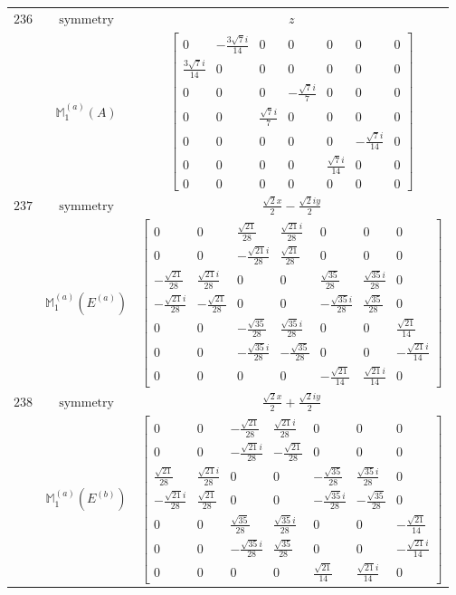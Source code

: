\documentclass[fleqn,8pt,landscape]{jsarticle}
\begin{document}
\begin{longtable}{ccc}
$ 236 $ & $ \text{symmetry} $ & $ z $ \\
$  $ & $ \mathbb{M}_{1}^{(a)}(A) $ & $ \begin{bmatrix} 0 & - \frac{3 \sqrt{7} i}{14} & 0 & 0 & 0 & 0 & 0 \\ \frac{3 \sqrt{7} i}{14} & 0 & 0 & 0 & 0 & 0 & 0 \\ 0 & 0 & 0 & - \frac{\sqrt{7} i}{7} & 0 & 0 & 0 \\ 0 & 0 & \frac{\sqrt{7} i}{7} & 0 & 0 & 0 & 0 \\ 0 & 0 & 0 & 0 & 0 & - \frac{\sqrt{7} i}{14} & 0 \\ 0 & 0 & 0 & 0 & \frac{\sqrt{7} i}{14} & 0 & 0 \\ 0 & 0 & 0 & 0 & 0 & 0 & 0 \end{bmatrix} $ \\ \hline
$ 237 $ & $ \text{symmetry} $ & $ \frac{\sqrt{2} x}{2} - \frac{\sqrt{2} i y}{2} $ \\
$  $ & $ \mathbb{M}_{1}^{(a)}(E^{(a)}) $ & $ \begin{bmatrix} 0 & 0 & \frac{\sqrt{21}}{28} & \frac{\sqrt{21} i}{28} & 0 & 0 & 0 \\ 0 & 0 & - \frac{\sqrt{21} i}{28} & \frac{\sqrt{21}}{28} & 0 & 0 & 0 \\ - \frac{\sqrt{21}}{28} & \frac{\sqrt{21} i}{28} & 0 & 0 & \frac{\sqrt{35}}{28} & \frac{\sqrt{35} i}{28} & 0 \\ - \frac{\sqrt{21} i}{28} & - \frac{\sqrt{21}}{28} & 0 & 0 & - \frac{\sqrt{35} i}{28} & \frac{\sqrt{35}}{28} & 0 \\ 0 & 0 & - \frac{\sqrt{35}}{28} & \frac{\sqrt{35} i}{28} & 0 & 0 & \frac{\sqrt{21}}{14} \\ 0 & 0 & - \frac{\sqrt{35} i}{28} & - \frac{\sqrt{35}}{28} & 0 & 0 & - \frac{\sqrt{21} i}{14} \\ 0 & 0 & 0 & 0 & - \frac{\sqrt{21}}{14} & \frac{\sqrt{21} i}{14} & 0 \end{bmatrix} $ \\ \hline
$ 238 $ & $ \text{symmetry} $ & $ \frac{\sqrt{2} x}{2} + \frac{\sqrt{2} i y}{2} $ \\
$  $ & $ \mathbb{M}_{1}^{(a)}(E^{(b)}) $ & $ \begin{bmatrix} 0 & 0 & - \frac{\sqrt{21}}{28} & \frac{\sqrt{21} i}{28} & 0 & 0 & 0 \\ 0 & 0 & - \frac{\sqrt{21} i}{28} & - \frac{\sqrt{21}}{28} & 0 & 0 & 0 \\ \frac{\sqrt{21}}{28} & \frac{\sqrt{21} i}{28} & 0 & 0 & - \frac{\sqrt{35}}{28} & \frac{\sqrt{35} i}{28} & 0 \\ - \frac{\sqrt{21} i}{28} & \frac{\sqrt{21}}{28} & 0 & 0 & - \frac{\sqrt{35} i}{28} & - \frac{\sqrt{35}}{28} & 0 \\ 0 & 0 & \frac{\sqrt{35}}{28} & \frac{\sqrt{35} i}{28} & 0 & 0 & - \frac{\sqrt{21}}{14} \\ 0 & 0 & - \frac{\sqrt{35} i}{28} & \frac{\sqrt{35}}{28} & 0 & 0 & - \frac{\sqrt{21} i}{14} \\ 0 & 0 & 0 & 0 & \frac{\sqrt{21}}{14} & \frac{\sqrt{21} i}{14} & 0 \end{bmatrix} $ \\ \hline

\end{longtable}
\end{document}
